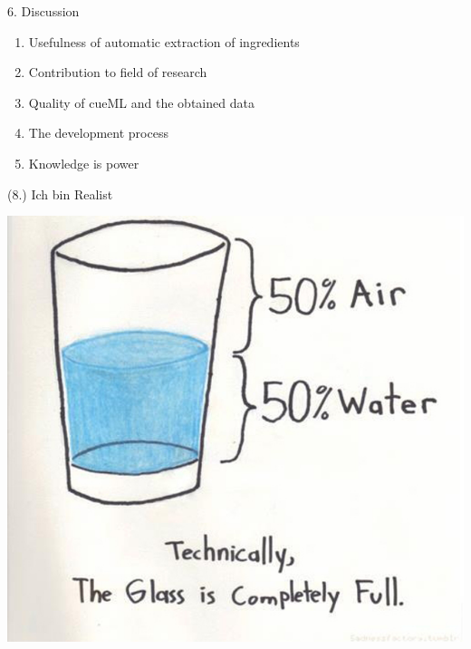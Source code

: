 \documentclass[12pt]{beamer}
\begin{document}
\begin{frame}{6. Discussion}
	\begin{enumerate}
		\item Usefulness of automatic extraction of ingredients
		\item Contribution to field of research
		\item Quality of cueML and the obtained data
		\item The development process
		\item Knowledge is power
	\end{enumerate}
\end{frame}

\begin{frame}{(8.) Ich bin Realist}
	\begin{minipage}{0.35\textwidth}
		\vspace*{0.7cm}\includegraphics[width=1\linewidth]{Images/Spoken-like-a-true-realist} \\
		

\end{minipage}
\end{frame}
\end{document}
